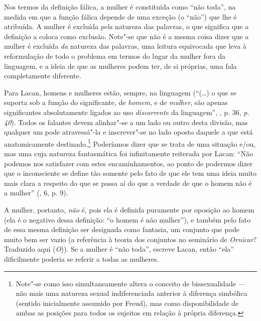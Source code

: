 Nos termos da definição fálica, a mulher é constituída como ``não
toda'', na medida em que a função fálica depende de uma exceção (o
``não'') que lhe é atribuída. A mulher é excluída \emph{pela} natureza
das palavras, o que significa que a definição a coloca como exclusão.
Note"-se que não é a mesma coisa dizer que a mulher é excluída \emph{da}
natureza das palavras, uma leitura equivocada que leva à reformulação de
todo o problema em termos do lugar da mulher fora da linguagem, e a
ideia de que as mulheres podem ter, de si próprias, uma fala
completamente diferente.

Para Lacan, homens e mulheres estão, sempre, na linguagem (``(\ldots{}) o que
se suporta sob a função do significante, de \emph{homem}, e de
\emph{mulher}, são apenas significantes absolutamente ligados ao uso
\emph{discorrente} da linguagem'', , p. 36, \emph{p. 40}). Todos os
falantes devem alinhar"-se a um lado ou outro desta divisão, mas qualquer
um pode atravessá"-la e inscrever"-se no lado oposto daquele a que está
anatomicamente destinado.\footnote{Note"-se como isso simultaneamente
  altera o conceito de bissexualidade --- não mais uma natureza sexual
  indiferenciada anterior à diferença simbólica (sentido inicialmente
  assumido por Freud), mas como disponibilidade de ambas as posições
  para todos os sujeitos em relação à própria diferença.} Poderíamos
dizer que se trata de uma situação e/ou, mas uma cuja natureza
fantasmática foi infinitamente reiterada por Lacan: ``Não podemos nos
satisfazer com estes encaminhamentos, ao ponto de podermos dizer que o
inconsciente se define tão somente pelo fato de que ele tem uma ideia
muito mais clara a respeito do que se passa aí do que a verdade de que o
homem não é a mulher'' (, 6, p. 9).

A mulher, portanto, \emph{não} é, pois ela é definida puramente por
oposição ao homem (ela é o negativo dessa definição: ``o homem é não
mulher''), e também pelo fato de essa mesma definição ser designada como
fantasia, um conjunto que pode muito bem ser vazio (a referência à
teoria dos conjuntos no seminário de \emph{Ornicar}? Traduzido aqui
(\emph{O})). Se a mulher é ``não toda'', escreve Lacan, então ``ela''
dificilmente poderia se referir a todas as mulheres.

